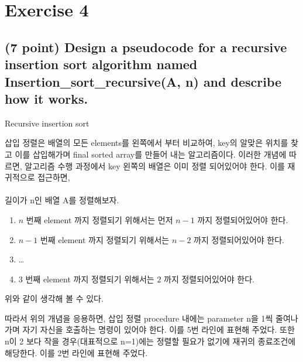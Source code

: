 \documentclass{article}
\begin{document}
\section{Exercise 4}
\subsection{(7 point) Design a pseudocode for a recursive insertion sort algorithm named Insertion\_sort\_recursive(A, n) and describe how it works.}


\begin{algorithm}
	\caption{Recursive insertion sort}
	\begin{algorithmic}[1]
	     
            \EndIf




            \EndWhile
        \EndProcedure
	\end{algorithmic}
\end{algorithm}

삽입 정렬은 배열의 모든 elements를 왼쪽에서 부터 비교하여, key의 알맞은 위치를 찾고 이를 삽입해가며 final sorted array를
만들어 내는 알고리즘이다. 이러한 개념에 따르면, 알고리즘 수행 과정에서 key 왼쪽의 배열은 이미 정렬 되어있어야 한다.
이를 재귀적으로 접근하면,\\ \\
\indent 길이가 n인 배열 A를 정렬해보자.
\begin{enumerate}
    \item $n$ 번째 element 까지 정렬되기 위해서는 먼저 $n-1$ 까지 정렬되어있어야 한다.
    \item $n-1$ 번째 element 까지 정렬되기 위해서는 $n-2$ 까지 정렬되어있어야 한다.
    \item \dots
    \item $3$ 번째 element 까지 정렬되기 위해서는 $2$ 까지 정렬되어있어야 한다.
\end{enumerate}
위와 같이 생각해 볼 수 있다.

따라서 위의 개념을 응용하면, 삽입 정렬 procedure 내에는 parameter n을 1씩 줄여나가며 자기 자신을
호출하는 명령이 있어야 한다. 이를 5번 라인에 표현해 주었다. 또한 n이 2 보다 작을 경우(대표적으로 n=1)에는 정렬할 필요가 없기에
재귀의 종료조건에 해당한다. 이를 2번 라인에 표현해 주었다.
\end{document}
